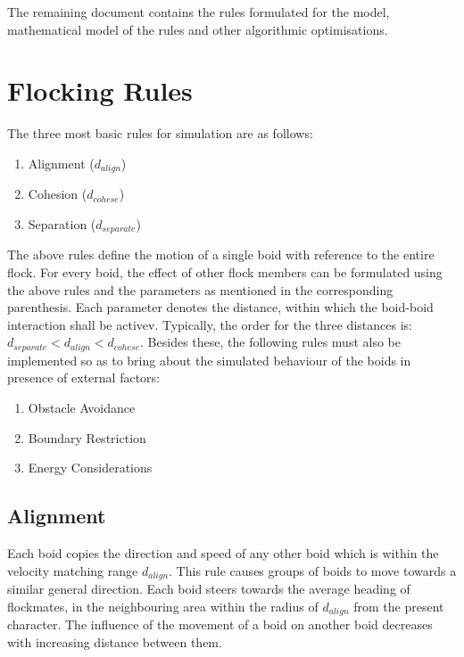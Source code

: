 \documentclass[12pt]{report}
\begin{document}
The remaining document contains the rules formulated for the model, mathematical model of the rules and other algorithmic optimisations.





\newpage
\section*{Flocking Rules}
The three most basic rules for simulation are as follows:
\begin{enumerate}
\item Alignment ($d_{align}$)
\item Cohesion ($d_{cohese}$)
\item Separation ($d_{separate}$)
\end{enumerate}
The above rules define the motion of a single boid with reference to the entire flock.
For every boid, the effect of other flock members can be formulated using the above rules and the parameters as mentioned in the corresponding parenthesis.  
\newline
Each parameter denotes the distance, within which the boid-boid interaction shall be activev. Typically, the order for the three distances is:  $d_{separate} < d_{align} < d_{cohese}$.
\newline
Besides these, the following rules must also be implemented so as to bring about the simulated behaviour of the boids in presence of external factors:
\begin{enumerate}
\item Obstacle Avoidance
\item Boundary Restriction
\item Energy Considerations
\end{enumerate}


\subsection*{Alignment}
Each boid copies the direction and speed of any other boid which is within the velocity matching range  
$d_{align}$. This rule causes groups of boids to move towards a similar general direction. Each boid steers towards the average heading of flockmates, in the neighbouring area within the radius of $d_{align}$ from the present character.
\newline
The influence of the movement of a boid on another boid decreases with increasing distance between them. 
\end{document}
